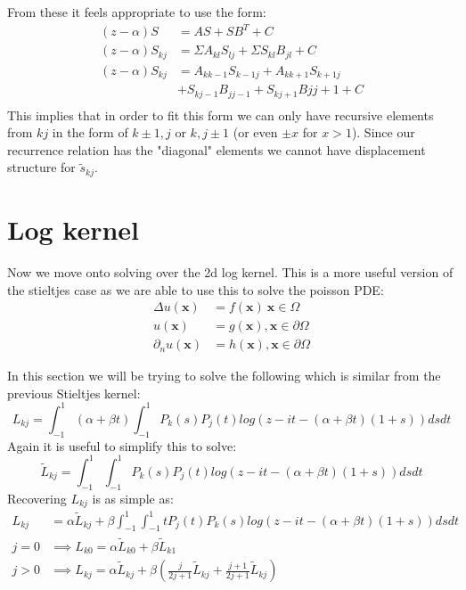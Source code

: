 \documentclass{article}
\begin{document}
From these it feels appropriate to use the form:
\begin{align}
    (z-\alpha)S&=AS+SB^T+C\\
    (z-\alpha)S_{kj}&=\Sigma A_{kl}S_{lj}+\Sigma S_{kl}B_{jl}+C\\
    (z-\alpha)S_{kj}&=A_{kk-1}S_{k-1j}+A_{kk+1}S_{k+1j}\\
    &+S_{kj-1}B_{jj-1}+S_{kj+1}B{jj+1}+C\\
\end{align}
This implies that in order to fit this form we can only have recursive elements from $kj$ in the form of $k\pm 1,j$ or $k,j\pm 1$ (or even $\pm x$ for $x>1$).
Since our recurrence relation has the "diagonal" elements we cannot have displacement structure for $\tilde s_{kj}$.

\section{Log kernel}
Now we move onto solving over the 2d log kernel.
This is a more useful version of the stieltjes case as we are able to use this to solve the poisson PDE:
\begin{align}
    \Delta u(\textbf{x}) &= f(\textbf{x})\:\textbf{x}\in\Omega\\
    u(\textbf{x}) &= g(\textbf{x}), \textbf{x}\in\partial\Omega\\
    \partial_nu(\textbf{x}) &= h(\textbf{x}), \textbf{x}\in\partial\Omega
\end{align}

In this section we will be trying to solve the following which is similar from the previous Stieltjes kernel:
$$L_{kj}=\int_{-1}^1(\alpha+\beta t)\int_{-1}^1P_k(s)P_j(t)log(z-it-(\alpha+\beta t)(1+s))dsdt$$
Again it is useful to simplify this to solve:
$$\tilde{L}_{kj} = \int_{-1}^1\int_{-1}^1P_k(s)P_j(t)log(z-it-(\alpha+\beta t)(1+s))dsdt$$
Recovering $L_{kj}$ is as simple as:
\begin{align}
    L_{kj}&=\alpha \tilde{L}_{kj} + \beta\int_{-1}^1\int_{-1}^1tP_j(t)P_k(s)log(z-it-(\alpha+\beta t)(1+s))dsdt\\
    j=0 &\implies L_{k0}=\alpha\tilde{L}_{k0}+\beta\tilde{L}_{k1}\\
    j>0 &\implies L_{kj}=\alpha\tilde{L}_{kj}+\beta(\frac{j}{2j+1}\tilde{L}_{kj}+\frac{j+1}{2j+1}\tilde{L}_{kj})
\end{align}
\end{document}
